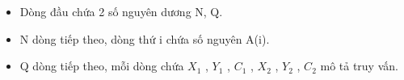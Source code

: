 \begin{itemize}
	\item      Dòng đầu chứa 2 số nguyên dương N, Q.    
	\item      N dòng tiếp theo, dòng thứ i chứa số nguyên A(i).    
	\item     Q dòng tiếp theo, mỗi dòng chứa $X_{1}$    , $Y_{1}$    , $C_{1}$    , $X_{2}$    , $Y_{2}$    , $C_{2}$    mô tả truy vấn.   
\end{itemize}